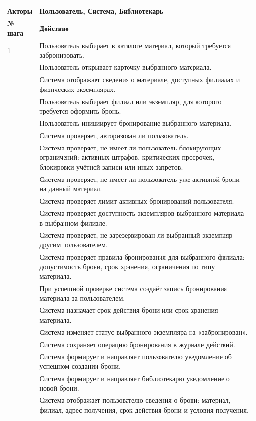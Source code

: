 \documentclass[12pt,a4paper]{article}
\begin{document}
\begin{xltabular}{\textwidth}{
				|>{\raggedright\arraybackslash}p{2.7cm}
				|>{\raggedright\arraybackslash}X|
			}
			\textbf{Акторы} &
			Пользователь, Система, Библиотекарь \\
			\hline
			
			
			\textbf{№ шага} & \textbf{Действие} \\
			\hline
			
			1 & Пользователь выбирает в каталоге материал, который требуется
			забронировать. \\
			 & Пользователь открывает карточку выбранного материала. \\
			 & Система отображает сведения о материале, доступных филиалах и
			физических экземплярах. \\
			 & Пользователь выбирает филиал или экземпляр, для которого требуется
			оформить бронь. \\
			 & Пользователь инициирует бронирование выбранного материала. \\
			 & Система проверяет, авторизован ли пользователь. \\
			 & Система проверяет, не имеет ли пользователь блокирующих
			ограничений: активных штрафов, критических просрочек, блокировки
			учётной записи или иных запретов. \\
			 & Система проверяет, не имеет ли пользователь уже активной брони на
			данный материал. \\
			 & Система проверяет лимит активных бронирований пользователя. \\
			 & Система проверяет доступность экземпляров выбранного материала в
			выбранном филиале. \\
			 & Система проверяет, не зарезервирован ли выбранный экземпляр другим
			пользователем. \\
			 & Система проверяет правила бронирования для выбранного филиала:
			допустимость брони, срок хранения, ограничения по типу материала. \\
			 & При успешной проверке система создаёт запись бронирования
			материала за пользователем. \\
			 & Система назначает срок действия брони или срок хранения материала. \\
			 & Система изменяет статус выбранного экземпляра на «забронирован». \\
			 & Система сохраняет операцию бронирования в журнале действий. \\
			 & Система формирует и направляет пользователю уведомление об
			успешном создании брони. \\
			 & Система формирует и направляет библиотекарю уведомление о новой
			брони. \\
			 & Система отображает пользователю сведения о брони: материал, филиал,
			адрес получения, срок действия брони и условия получения. \\
			\hline
			

\end{xltabular}
\end{document}
